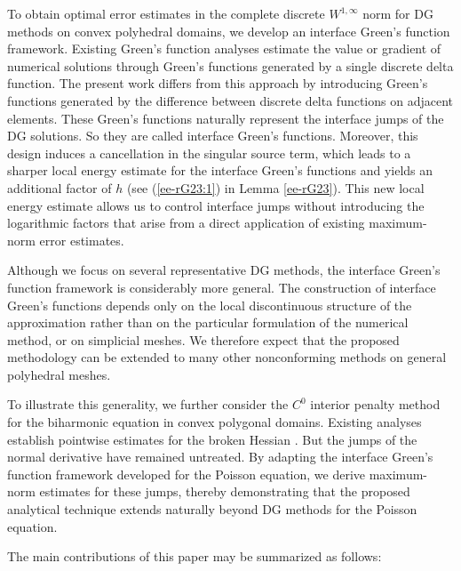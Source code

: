 \documentclass[1996/10/24]{amsart}
\theoremstyle{definition}
\numberwithin{equation}{section}
\begin{document}
To obtain optimal error estimates in the complete discrete $W^{1,\infty}$ norm for DG methods on convex polyhedral 
domains, we develop an interface Green's function framework. Existing Green's function analyses estimate the value 
or gradient of numerical solutions through Green's functions generated by a single discrete delta function. The 
present work differs from this approach by introducing Green's functions generated by the difference between 
discrete delta functions on adjacent elements. These Green's functions naturally represent the interface jumps 
of the DG solutions. So they are called interface Green's functions. Moreover, this design induces a cancellation 
in the singular source term, which leads to a sharper local energy estimate for the interface Green's functions 
and yields an additional factor of $h$ (see (\ref{ee-rG23:1}) in Lemma \ref{ee-rG23}). This new local energy 
estimate allows us to control interface jumps without introducing the logarithmic factors that arise from 
a direct application of existing maximum-norm error estimates.

Although we focus on several representative DG methods, the interface Green's function framework is considerably more general. The construction of interface Green's functions depends only on the local discontinuous structure of the approximation rather than on the particular formulation of the numerical method, or on simplicial meshes. We therefore expect that the proposed methodology can be extended to many other nonconforming methods on general polyhedral meshes.

To illustrate this generality, we further consider the $C^0$ interior penalty method for the biharmonic equation in convex polygonal domains. Existing analyses establish pointwise estimates for the broken Hessian \cite{l2021,hltwz2026}. But the jumps of the normal derivative have remained untreated. By adapting the interface Green's function framework developed for the Poisson equation, we derive maximum-norm estimates for these jumps, thereby demonstrating that the proposed analytical technique extends naturally beyond DG methods for the Poisson equation.

The main contributions of this paper may be summarized as follows:
\end{document}
